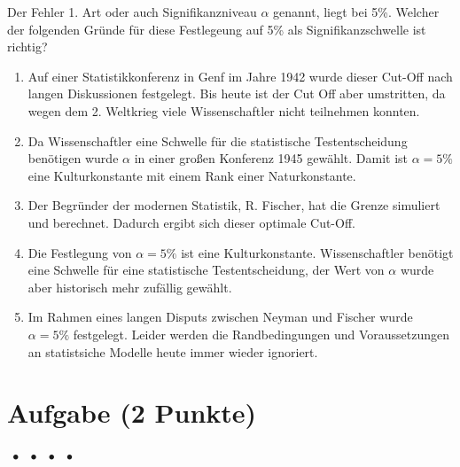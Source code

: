 \documentclass[a4paper, 9pt]{scrartcl}\usepackage[]{graphicx}\usepackage[]{xcolor}
\begin{document}
Der Fehler 1. Art oder auch Signifikanzniveau $\alpha$ genannt, liegt bei
5\%. Welcher der folgenden Gründe für diese Festlegeung auf 5\% als Signifikanzschwelle ist richtig?



\begin{enumerate}
\item [\textbf{A} \msquare] Auf einer Statistikkonferenz in Genf im Jahre 1942 wurde dieser Cut-Off nach langen Diskussionen festgelegt. Bis heute ist der Cut Off aber umstritten, da wegen dem 2. Weltkrieg viele Wissenschaftler nicht teilnehmen konnten.
\item [\textbf{B} \msquare] Da Wissenschaftler eine Schwelle für die statistische Testentscheidung benötigen wurde $\alpha$ in einer großen Konferenz 1945 gewählt. Damit ist $\alpha = 5\%$ eine Kulturkonstante mit einem Rank einer Naturkonstante.
\item [\textbf{C} \msquare] Der Begründer der modernen Statistik, R. Fischer, hat die Grenze simuliert und berechnet. Dadurch ergibt sich dieser optimale Cut-Off.
\item [\textbf{D} \msquare] Die Festlegung von $\alpha = 5\%$ ist eine Kulturkonstante. Wissenschaftler benötigt eine Schwelle für eine statistische Testentscheidung, der Wert von $\alpha$ wurde aber historisch mehr zufällig gewählt.
\item [\textbf{E} \msquare] Im Rahmen eines langen Disputs zwischen Neyman und Fischer wurde $\alpha = 5\%$ festgelegt. Leider werden die Randbedingungen und Voraussetzungen an statistsiche Modelle heute immer wieder ignoriert.
\end{enumerate}

\section{Aufgabe \hfill (2 Punkte)}

\ifcollection
\begin{flushright}
\tiny\vspace{-2Ex}
\textbf{\examinhaltstart}
\exammodulemathstat $\;\bullet$
\exammodulestat $\;\bullet$
\exammodulestatbbv $\;\bullet$
\exammodulestatversuch $\;\bullet$
\exammodulebiostat
\vspace{-1Ex}
\end{flushright}
\fi
\end{document}
